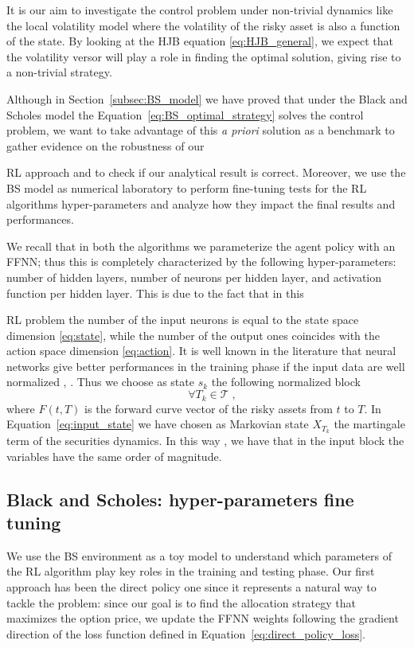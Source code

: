 \documentclass[runningheads]{m2ef}
\newcommand\soutpars[1]{\let\helpcmd\sout\parhelp#1\par\relax\relax}
\newcommand{\change}[1]{{\color{red} {#1}}}%
\newcommand{\remove}[1]{{\color{red} \soutpars{{#1}}}}%
\begin{document}
It is our aim to investigate the control problem under non-trivial dynamics like the local volatility model where the volatility of the risky asset is also a function of the state. By looking at the HJB equation \eqref{eq:HJB_general}, we expect that the volatility versor will play a role in finding the optimal solution, giving rise to a non-trivial strategy.

Although in Section~\ref{subsec:BS_model} we have proved that under the Black and Scholes model the Equation~\eqref{eq:BS_optimal_strategy} solves the control problem, we want to take advantage of this \textit{a priori} solution as a benchmark to gather evidence on the robustness of our \remove{Reinforcement Learning} \change{RL} approach and to check if our analytical result is correct. Moreover, we use the BS model as numerical laboratory to perform fine-tuning tests for the RL algorithms hyper-parameters and analyze how they impact the final results and performances.

We recall that in both the algorithms we parameterize the agent policy with an FFNN; thus this is completely characterized by the following hyper-parameters: number of hidden layers, number of neurons per hidden layer, \change{and} activation function per hidden layer. This is due to the fact that in this \remove{Reinforcement Learning} \change{RL} problem the number of the input neurons is equal to the state space dimension \eqref{eq:state}, while the number of the output ones coincides with the action space dimension \eqref{eq:action}. It is well known in the literature that neural networks give better performances in the training phase if the input data are well normalized \cite{Puheim2014}, \cite{Sola1997}. Thus we choose as state $s_k$ the following normalized block  
\begin{equation}
	[\log(S_{T_k}/F(0,T_k)), I_{T_k}/I_0, T_k ] \quad \forall T_k\in\mathcal{T} \; ,
\label{eq:input_state}\end{equation}
where $F(t,T)$ is the forward curve vector of the risky assets from $t$ to $T$. In Equation~\eqref{eq:input_state} we have chosen as Markovian state $X_{T_k}$ the martingale term of the securities dynamics. In this way\change{,} we have that in the input block the variables have the same order of magnitude.


\subsection{Black and Scholes: hyper-parameters fine tuning}
We use the BS environment as \change{a} toy model to understand which parameters of the RL algorithm play key roles in the training and testing phase. 
Our first approach has been the direct policy one since it represents a natural way to tackle the problem: since our goal is to find the allocation 
strategy that maximizes the option price, we update the FFNN weights following the gradient direction of the loss function defined in Equation~\eqref{eq:direct_policy_loss}. 
\end{document}
